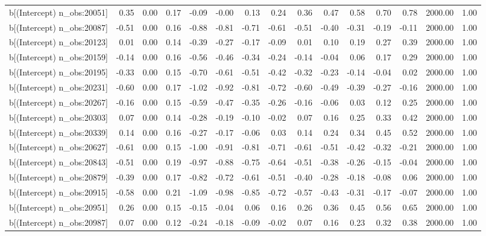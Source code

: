 \begin{table}[ht]
\begin{tabular}{rrrrrrrrrrrrrrr}
  b[(Intercept) n\_obs:20051] & 0.35 & 0.00 & 0.17 & -0.09 & -0.00 & 0.13 & 0.24 & 0.36 & 0.47 & 0.58 & 0.70 & 0.78 & 2000.00 & 1.00 \\ 
  b[(Intercept) n\_obs:20087] & -0.51 & 0.00 & 0.16 & -0.88 & -0.81 & -0.71 & -0.61 & -0.51 & -0.40 & -0.31 & -0.19 & -0.11 & 2000.00 & 1.00 \\ 
  b[(Intercept) n\_obs:20123] & 0.01 & 0.00 & 0.14 & -0.39 & -0.27 & -0.17 & -0.09 & 0.01 & 0.10 & 0.19 & 0.27 & 0.39 & 2000.00 & 1.00 \\ 
  b[(Intercept) n\_obs:20159] & -0.14 & 0.00 & 0.16 & -0.56 & -0.46 & -0.34 & -0.24 & -0.14 & -0.04 & 0.06 & 0.17 & 0.29 & 2000.00 & 1.00 \\ 
  b[(Intercept) n\_obs:20195] & -0.33 & 0.00 & 0.15 & -0.70 & -0.61 & -0.51 & -0.42 & -0.32 & -0.23 & -0.14 & -0.04 & 0.02 & 2000.00 & 1.00 \\ 
  b[(Intercept) n\_obs:20231] & -0.60 & 0.00 & 0.17 & -1.02 & -0.92 & -0.81 & -0.72 & -0.60 & -0.49 & -0.39 & -0.27 & -0.16 & 2000.00 & 1.00 \\ 
  b[(Intercept) n\_obs:20267] & -0.16 & 0.00 & 0.15 & -0.59 & -0.47 & -0.35 & -0.26 & -0.16 & -0.06 & 0.03 & 0.12 & 0.25 & 2000.00 & 1.00 \\ 
  b[(Intercept) n\_obs:20303] & 0.07 & 0.00 & 0.14 & -0.28 & -0.19 & -0.10 & -0.02 & 0.07 & 0.16 & 0.25 & 0.33 & 0.42 & 2000.00 & 1.00 \\ 
  b[(Intercept) n\_obs:20339] & 0.14 & 0.00 & 0.16 & -0.27 & -0.17 & -0.06 & 0.03 & 0.14 & 0.24 & 0.34 & 0.45 & 0.52 & 2000.00 & 1.00 \\ 
  b[(Intercept) n\_obs:20627] & -0.61 & 0.00 & 0.15 & -1.00 & -0.91 & -0.81 & -0.71 & -0.61 & -0.51 & -0.42 & -0.32 & -0.21 & 2000.00 & 1.00 \\ 
  b[(Intercept) n\_obs:20843] & -0.51 & 0.00 & 0.19 & -0.97 & -0.88 & -0.75 & -0.64 & -0.51 & -0.38 & -0.26 & -0.15 & -0.04 & 2000.00 & 1.00 \\ 
  b[(Intercept) n\_obs:20879] & -0.39 & 0.00 & 0.17 & -0.82 & -0.72 & -0.61 & -0.51 & -0.40 & -0.28 & -0.18 & -0.08 & 0.06 & 2000.00 & 1.00 \\ 
  b[(Intercept) n\_obs:20915] & -0.58 & 0.00 & 0.21 & -1.09 & -0.98 & -0.85 & -0.72 & -0.57 & -0.43 & -0.31 & -0.17 & -0.07 & 2000.00 & 1.00 \\ 
  b[(Intercept) n\_obs:20951] & 0.26 & 0.00 & 0.15 & -0.15 & -0.04 & 0.06 & 0.16 & 0.26 & 0.36 & 0.45 & 0.56 & 0.65 & 2000.00 & 1.00 \\ 
  b[(Intercept) n\_obs:20987] & 0.07 & 0.00 & 0.12 & -0.24 & -0.18 & -0.09 & -0.02 & 0.07 & 0.16 & 0.23 & 0.32 & 0.38 & 2000.00 & 1.00 \\ 

\end{tabular}
\end{table}
